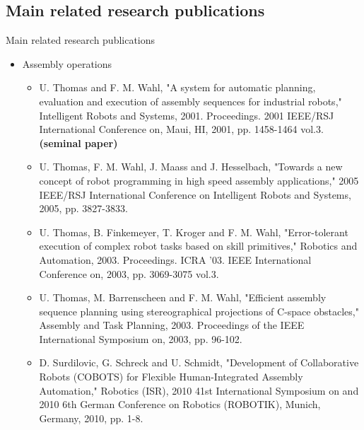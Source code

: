 \subsection{Main related research publications}
\begin{frame}{Main related research publications}
	\begin{itemize}
		\item Assembly operations
		\begin{itemize}
			\begingroup
			\scriptsize
			\item U. Thomas and F. M. Wahl, "A system for automatic planning, evaluation and execution of assembly sequences for industrial robots," Intelligent Robots and Systems, 2001. Proceedings. 2001 IEEE/RSJ International Conference on, Maui, HI, 2001, pp. 1458-1464 vol.3. \textbf{(seminal paper)}
			\item U. Thomas, F. M. Wahl, J. Maass and J. Hesselbach, "Towards a new concept of robot programming in high speed assembly applications," 2005 IEEE/RSJ International Conference on Intelligent Robots and Systems, 2005, pp. 3827-3833.
			\item U. Thomas, B. Finkemeyer, T. Kroger and F. M. Wahl, "Error-tolerant execution of complex robot tasks based on skill primitives," Robotics and Automation, 2003. Proceedings. ICRA '03. IEEE International Conference on, 2003, pp. 3069-3075 vol.3.
			\item U. Thomas, M. Barrenscheen and F. M. Wahl, "Efficient assembly sequence planning using stereographical projections of C-space obstacles," Assembly and Task Planning, 2003. Proceedings of the IEEE International Symposium on, 2003, pp. 96-102.
			\item D. Surdilovic, G. Schreck and U. Schmidt, "Development of Collaborative Robots (COBOTS) for Flexible Human-Integrated Assembly Automation," Robotics (ISR), 2010 41st International Symposium on and 2010 6th German Conference on Robotics (ROBOTIK), Munich, Germany, 2010, pp. 1-8.
			\endgroup
		\end{itemize}
	\end{itemize}
\end{frame}

